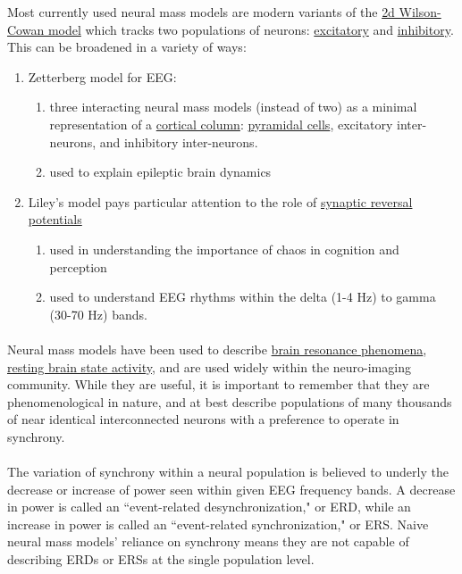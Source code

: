 \documentclass{article}
\begin{document}
Most currently used neural mass models are modern variants of the \underline{2d Wilson-Cowan model} which tracks two populations of neurons: \underline{excitatory} and \underline{inhibitory}. This can be broadened in a variety of ways:
\begin{enumerate}
\item Zetterberg model for EEG:
\begin{enumerate}
\item three interacting neural mass models (instead of two) as a minimal representation of a \underline{cortical column}: \underline{pyramidal cells}, excitatory inter-neurons, and inhibitory inter-neurons.
\item used to explain epileptic brain dynamics
\end{enumerate}
\item Liley's model pays particular attention to the role of \underline{synaptic reversal potentials}
\begin{enumerate}
\item used in understanding the importance of chaos in cognition and perception
\item used to understand EEG rhythms within the delta (1-4 Hz) to gamma (30-70 Hz) bands.
\end{enumerate}
\end{enumerate}

\paragraph{}
Neural mass models have been used to describe \underline{brain resonance phenomena}, \underline{resting brain state activity}, and are used widely within the neuro-imaging community. While they are useful, it is important to remember that they are phenomenological in nature, and at best describe populations of many thousands of near identical interconnected neurons with a preference to operate in synchrony.

\paragraph{}
The variation of synchrony within a neural population is believed to underly the decrease or increase of power seen within given EEG frequency bands. A decrease in power is called an ``event-related desynchronization," or ERD, while an increase in power is called an ``event-related synchronization," or ERS. Naive neural mass models' reliance on synchrony means they are not capable of describing ERDs or ERSs at the single population level.
\end{document}
